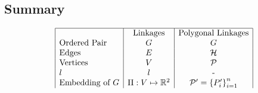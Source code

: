 \subsection{Summary}
$$\begin{array}{|l|c|c|}
 \hline
&\text{Linkages}&\text{Polygonal Linkages}\\
\text{Ordered Pair}&G&G\\
\text{Edges}&E&{\cal H}\\
\text{Vertices}&V&{\cal P}\\
l&l&\text{-}\\
\text{Embedding of }G&\Pi : V \mapsto {\mathbb{R}}^2&{\cal P} ' = \left\lbrace P_i ' \right\rbrace_{i=1}^n
\end{array}$$



